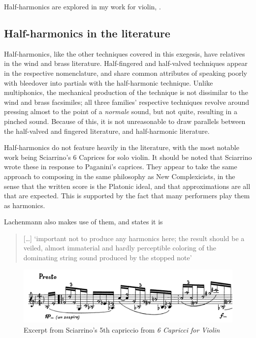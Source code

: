 Half-harmonics are explored in my work for violin, .

\subsection{Half-harmonics in the literature}
Half-harmonics, like the other techniques covered in this exegesis, have relatives in the wind and brass literature. 
Half-fingered and half-valved techniques appear in the respective nomenclature, and share common attributes of speaking poorly with bleedover into partials with the half-harmonic technique.
Unlike multiphonics, the mechanical production of the technique is not dissimilar to the wind and brass facsimiles; all three families' respective techniques revolve around pressing almost to the point of a \emph{normale} sound, but not quite, resulting in a pinched sound.
Because of this, it is not unreasonable to draw parallels between the half-valved and fingered literature, and half-harmonic literature. 

Half-harmonics do not feature heavily in the literature, with the most notable work being Sciarrino's 6 Caprices for solo violin.\autocite{sciarrinoCapricciViolino1976} 
It should be noted that Sciarrino wrote these in response to Paganini's caprices. 
They appear to take the same approach to composing in the same philosophy as New Complexicists, in the sense that the written score is the Platonic ideal, and that approximations are all that are expected.
This is supported by the fact that many performers play them as harmonics.\autocite[]{appleseedFeedbackExploratorySession2019}


Lachenmann also makes use of them, and states it is
\begin{quotation}
  [\dots] `important not to produce any harmonics here; the result should be a veiled, almost immaterial and hardly perceptible coloring of the dominating string sound produced by the stopped note'\autocite[foreword]{lachenmannMusikFurStreichquartett1972}
\end{quotation}

\begin{figure}
  \includegraphics[width=\linewidth]{./resources/sciarrinoHalfHarmonicNotation.pdf}
  \caption{Excerpt from Sciarrino's 5th capriccio from \emph{6 Capricci for Violin}}
\label{fig:sciarrinoExcerpt}
\end{figure}

